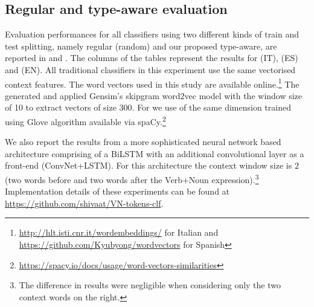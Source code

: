 \documentclass[output=paper
,modfonts
,nonflat]{langsci/langscibook}
\begin{document}
\subsection{Regular and type-aware evaluation}
\label{sec:res1}
Evaluation performances for all classifiers using two different kinds of train and test splitting, namely regular (random) and our proposed type-aware, are reported in  and .
The columns of the tables represent the results for  (IT),  (ES) and  (EN).
All traditional classifiers in this experiment use the same vectorised context features. 
The word vectors used in this study are available online.\footnote{\url{http://hlt.isti.cnr.it/wordembeddings/} for Italian and \url{https://github.com/Kyubyong/wordvectors} for Spanish} The generated  and   applied Gensim’s skipgram word2vec model with the window size of 10 to extract vectors of size 300.
For  we use  of the same dimension trained using Glove \citep{pennington2014glove} algorithm available via spaCy.\footnote{\url{https://spacy.io/docs/usage/word-vectors-similarities}}

We also report the results from a more sophisticated neural network based architecture comprising of a BiLSTM with an additional convolutional layer as a front-end (ConvNet+LSTM). For this architecture the context window size is $2$ (two words before and two words after the Verb+Noun expression).\footnote{The difference in results were negligible when considering only the two context words on the right.} Implementation details of these experiments can be found at \url{https://github.com/shivaat/VN-tokens-clf}. 
\end{document}

